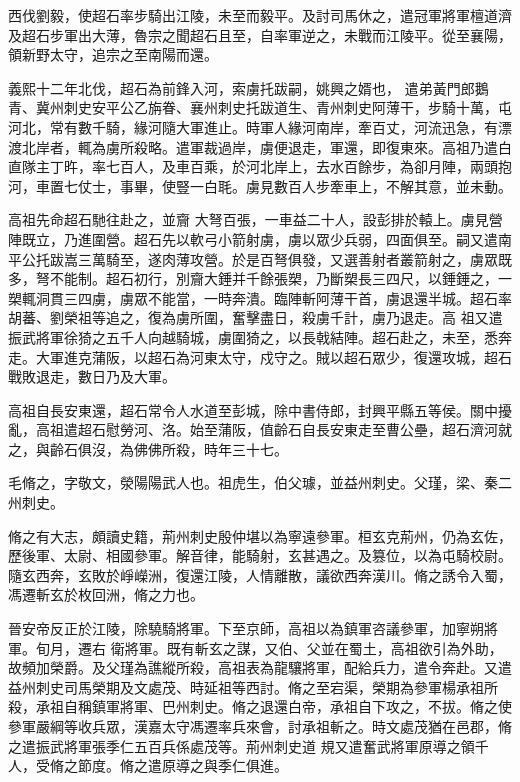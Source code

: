 \begin{pinyinscope}
 西伐劉毅，使超石率步騎出江陵，未至而毅平。及討司馬休之，遣冠軍將軍檀道濟及超石步軍出大薄，魯宗之聞超石且至，自率軍逆之，未戰而江陵平。從至襄陽，領新野太守，追宗之至南陽而還。



 義熙十二年北伐，超石為前鋒入河，索虜托跋嗣，姚興之婿也，
 遣弟黃門郎鵝青、冀州刺史安平公乙旃眷、襄州刺史托跋道生、青州刺史阿薄干，步騎十萬，屯河北，常有數千騎，緣河隨大軍進止。時軍人緣河南岸，牽百丈，河流迅急，有漂渡北岸者，輒為虜所殺略。遣軍裁過岸，虜便退走，軍還，即復東來。高祖乃遣白直隊主丁旿，率七百人，及車百乘，於河北岸上，去水百餘步，為卻月陣，兩頭抱河，車置七仗士，事畢，使豎一白毦。虜見數百人步牽車上，不解其意，並未動。



 高祖先命超石馳往赴之，並齎
 大弩百張，一車益二十人，設彭排於轅上。虜見營陣既立，乃進圍營。超石先以軟弓小箭射虜，虜以眾少兵弱，四面俱至。嗣又遣南平公托跋嵩三萬騎至，遂肉薄攻營。於是百弩俱發，又選善射者叢箭射之，虜眾既多，弩不能制。超石初行，別齎大錘并千餘張槊，乃斷槊長三四尺，以錘錘之，一槊輒洞貫三四虜，虜眾不能當，一時奔潰。臨陣斬阿薄干首，虜退還半城。超石率胡蕃、劉榮祖等追之，復為虜所圍，奮擊盡日，殺虜千計，虜乃退走。高
 祖又遣振武將軍徐猗之五千人向越騎城，虜圍猗之，以長戟結陣。超石赴之，未至，悉奔走。大軍進克蒲阪，以超石為河東太守，戍守之。賊以超石眾少，復還攻城，超石戰敗退走，數日乃及大軍。



 高祖自長安東還，超石常令人水道至彭城，除中書侍郎，封興平縣五等侯。關中擾亂，高祖遣超石慰勞河、洛。始至蒲阪，值齡石自長安東走至曹公壘，超石濟河就之，與齡石俱沒，為佛佛所殺，時年三十七。



 毛脩之，字敬文，滎陽陽武人也。祖虎生，伯父璩，並益州刺史。父瑾，梁、秦二州刺史。



 脩之有大志，頗讀史籍，荊州刺史殷仲堪以為寧遠參軍。桓玄克荊州，仍為玄佐，歷後軍、太尉、相國參軍。解音律，能騎射，玄甚遇之。及篡位，以為屯騎校尉。隨玄西奔，玄敗於崢嶸洲，復還江陵，人情離散，議欲西奔漢川。脩之誘令入蜀，馮遷斬玄於枚回洲，脩之力也。



 晉安帝反正於江陵，除驍騎將軍。下至京師，高祖以為鎮軍咨議參軍，加寧朔將軍。旬月，遷右
 衛將軍。既有斬玄之謀，又伯、父並在蜀土，高祖欲引為外助，故頻加榮爵。及父瑾為譙縱所殺，高祖表為龍驤將軍，配給兵力，遣令奔赴。又遣益州刺史司馬榮期及文處茂、時延祖等西討。脩之至宕渠，榮期為參軍楊承祖所殺，承祖自稱鎮軍將軍、巴州刺史。脩之退還白帝，承祖自下攻之，不拔。脩之使參軍嚴綱等收兵眾，漢嘉太守馮遷率兵來會，討承祖斬之。時文處茂猶在邑郡，脩之遣振武將軍張季仁五百兵係處茂等。荊州刺史道
 規又遣奮武將軍原導之領千人，受脩之節度。脩之遣原導之與季仁俱進。




\end{pinyinscope}
